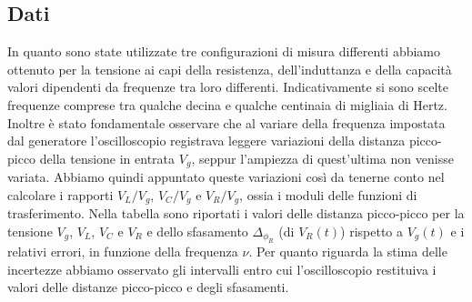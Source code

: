 \documentclass[a4paper]{article}
\begin{document}
\subsection{Dati}
In quanto sono state utilizzate tre configurazioni di misura differenti abbiamo ottenuto per la tensione ai capi della resistenza, dell'induttanza e della capacità valori dipendenti da frequenze tra loro differenti. Indicativamente si sono scelte frequenze comprese tra qualche decina e qualche centinaia di migliaia di Hertz. Inoltre è stato fondamentale osservare che al variare della frequenza impostata dal generatore l'oscilloscopio registrava leggere variazioni della distanza picco-picco della tensione in entrata $V_g$, seppur l'ampiezza di quest'ultima non venisse variata. Abbiamo quindi appuntato queste variazioni così da tenerne conto nel calcolare i rapporti $V_L/V_g$, $V_C/V_g$ e $V_R/V_g$, ossia i moduli delle funzioni di trasferimento. Nella tabella sono riportati i valori delle distanza picco-picco per la tensione $V_g$, $V_L$, $V_C$ e $V_R$ e dello sfasamento $\Delta_{\phi_R}$ (di $V_R (t)$) rispetto a $V_g (t)$ e i relativi errori, in funzione della frequenza $\nu$. Per quanto riguarda la stima delle incertezze abbiamo osservato gli intervalli entro cui l'oscilloscopio restituiva i valori delle distanze picco-picco e degli sfasamenti.
\end{document}
